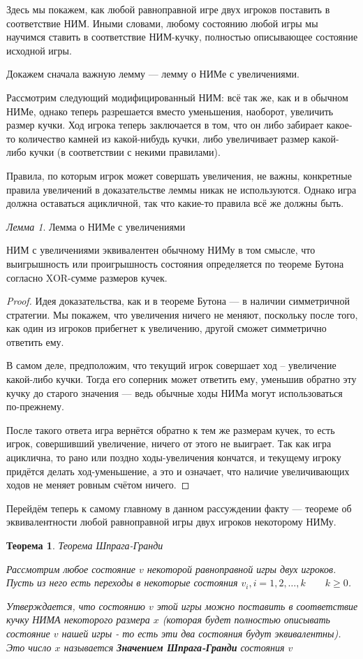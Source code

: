 \documentclass[aps,%
12pt,%
final,%
oneside,
onecolumn,%
musixtex, %
superscriptaddress,%
centertags]{article} %
\theoremstyle{plain}
\newtheorem{theorem}{Теорема}[section] %
\theoremstyle{definition}
\theoremstyle{remark}
\newtheorem{lemma}{Лемма}[section]
\begin{document}
Здесь мы покажем, как любой равноправной игре двух игроков поставить в соответствие НИМ. Иными словами, любому состоянию любой игры мы научимся ставить в соответствие НИМ-кучку, полностью описывающее состояние исходной игры.

Докажем сначала важную лемму — лемму о НИМе с увеличениями.

Рассмотрим следующий модифицированный НИМ: всё так же, как и в обычном НИМе, однако теперь разрешается вместо уменьшения, наоборот, увеличить размер кучки. Ход игрока теперь заключается в том, что он либо забирает какое-то количество камней из какой-нибудь кучки, либо увеличивает размер какой-либо кучки (в соответствии с некими правилами).

Правила, по которым игрок может совершать увеличения, не важны, конкретные правила увеличений в доказательстве леммы никак не используются. Однако игра должна оставаться ацикличной, так что какие-то правила всё же должны быть.

\begin{lemma}
  Лемма о НИМе с увеличениями

  НИМ с увеличениями эквивалентен обычному НИМу в том смысле, что выигрышность или проигрышность состояния определяется по теореме Бутона согласно XOR-сумме размеров кучек.
\end{lemma}
\begin{proof}
  Идея доказательства, как и в теореме Бутона — в наличии симметричной стратегии. Мы покажем, что увеличения ничего не меняют, поскольку после того, как один из игроков прибегнет к увеличению, другой сможет симметрично ответить ему.

  В самом деле, предположим, что текущий игрок совершает ход – увеличение какой-либо кучки. Тогда его соперник может ответить ему, уменьшив обратно эту кучку до старого значения — ведь обычные ходы НИМа могут использоваться по-прежнему.

  После такого ответа игра вернётся обратно к тем же размерам кучек, то есть игрок, совершивший увеличение, ничего от этого не выиграет. Так как игра ациклична, то рано или поздно ходы-увеличения кончатся, и текущему игроку придётся делать ход-уменьшение, а это и означает, что наличие увеличивающих ходов не меняет ровным счётом ничего.
\end{proof}

Перейдём теперь к самому главному в данном рассуждении факту — теореме об эквивалентности любой равноправной игры двух игроков некоторому НИМу.

\begin{theorem}
  Теорема Шпрага-Гранди

  Рассмотрим любое состояние $v$ некоторой равноправной игры двух игроков. Пусть из него есть переходы в некоторые состояния $v_i, i=1,2,\ldots,k \qquad k \geq 0$. 

  Утверждается, что состоянию $v$ этой игры можно поставить в соответствие кучку НИМА некоторого размера $x$ (которая будет полностью описывать состояние $v$ нашей игры - то есть эти два состояния будут эквивалентны). Это число $x$ называется \textbf{Значением Шпрага-Гранди} состояния $v$
\end{theorem}
\end{document}
